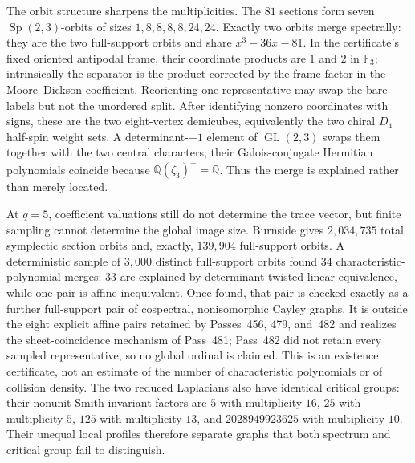 \documentclass[11pt]{article}
\theoremstyle{plain}
\theoremstyle{definition}
\newcommand{\FF}{\mathbb F}
\newcommand{\QQ}{\mathbb Q}
\begin{document}
The orbit structure sharpens the multiplicities.  The $81$ sections form
seven $\operatorname{Sp}(2,3)$-orbits of sizes
$1,8,8,8,8,24,24$.  Exactly two orbits merge spectrally: they are the two
full-support orbits and share $x^3-36x-81$.  In the certificate's fixed
oriented antipodal frame, their coordinate products are $1$ and $2$ in
$\FF_3$; intrinsically the separator is the product corrected by the frame
factor in the Moore--Dickson coefficient. Reorienting one representative may swap
the bare labels but not the unordered split. After identifying nonzero coordinates with signs,
these are the two eight-vertex demicubes, equivalently the two chiral
$D_4$ half-spin weight sets.  A determinant-$-1$ element of
$\operatorname{GL}(2,3)$ swaps them together with the two central characters;
their Galois-conjugate Hermitian polynomials coincide because
$\QQ(\zeta_3)^+=\QQ$.  Thus the merge is explained rather than
merely located.

At $q=5$, coefficient valuations still do not determine the trace vector, but
finite sampling cannot determine the global image size.  Burnside gives
$2{,}034{,}735$ total symplectic section orbits and, exactly,
$139{,}904$ full-support orbits.  A deterministic sample of $3{,}000$ distinct
full-support orbits found $34$ characteristic-polynomial merges: $33$ are
explained by determinant-twisted linear equivalence, while one pair is
affine-inequivalent.  Once found, that pair is checked exactly as a further
full-support pair of cospectral, nonisomorphic Cayley graphs.  It is outside
the eight explicit affine pairs retained by Passes~456, 479, and~482 and realizes the
sheet-coincidence mechanism of Pass~481; Pass~482 did not retain every sampled
representative, so no global ordinal is claimed.  This is an existence
certificate, not an estimate of the number of characteristic polynomials or
of collision density.  The two reduced Laplacians also have identical critical
groups: their nonunit Smith invariant factors are $5$ with multiplicity $16$,
$25$ with multiplicity $5$, $125$ with multiplicity $13$, and
$2028949923625$ with multiplicity $10$.  Their unequal local profiles therefore
separate graphs that both spectrum and critical group fail to distinguish.
\end{document}
